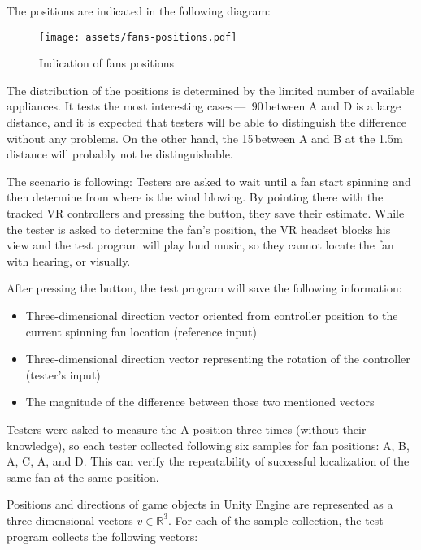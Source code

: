 The positions are indicated in the following diagram:


\begin{figure}[h]{}
\centering\texttt{[image: assets/fans-positions.pdf]}
\caption{Indication of fans positions}

\end{figure}

The distribution of the positions is determined by the limited number of
available appliances. It tests the most interesting cases — 
90\degree\,between A and D is a large distance, and it is expected that testers
will be able to distinguish the difference without any problems.
On the other hand, the 15\degree\,between
A and B at the 1.5m distance will probably not be distinguishable.



The scenario is following: Testers are asked to wait until a fan start spinning
and then determine from where is the wind blowing. By pointing there with the
tracked VR controllers and pressing the button, they save their estimate.
While the tester is asked to determine the fan’s position, the VR headset
blocks his view and the test program will play loud music, so they
cannot locate the fan with hearing, or visually.

After pressing the button, the test program will save the following information:

\begin{itemize}
\item Three-dimensional direction vector oriented from controller position to
the current spinning fan location (reference input)
\item Three-dimensional direction vector representing the rotation of the
controller (tester’s input)
\item The magnitude of the difference between those two mentioned vectors
\end{itemize}

Testers were asked to measure the A position three times (without their knowledge),
so each tester collected following six samples for fan positions: A, B, A, C,
A, and D. This can verify the repeatability of successful
localization of the same fan at the same position.

Positions and directions of game objects in Unity Engine are represented as 
a three-dimensional vectors \( v \in \mathbb{R}^3 \). For each of the sample collection, 
the test program collects the following vectors:

